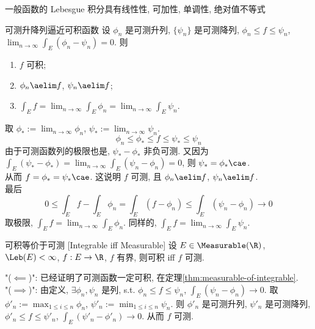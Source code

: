 \begin{ppt}
    {一般函数的 Lebesgue 积分具有线性性, 可加性, 单调性, 绝对值不等式}
\end{ppt}
\begin{thm}
    {可测升降列逼近可积函数}
    设 \({\phi_n}\) 是可测升列, \(\{\psi_n\}\) 是可测降列, \(\phi_n\leq f\leq\psi_n\), \(\lim_{n\to\infty}\int_E (\phi_n-\psi_n)=0\). 则
    \begin{enumerate}
        \item \(f\) 可积;
        \item \(\phi_n\aelim f\), \(\psi_n\aelim f\);
        \item \(\displaystyle\int_E f = \lim_{n\to\infty} \int_E \phi_n = \lim_{n\to\infty} \int_E \psi_n\).
    \end{enumerate}
\end{thm}
\begin{prf}
    取 \(\phi_*:=\lim_{n\to\infty}\phi_n\), \(\psi_*:=\lim_{n\to\infty}\psi_n\). 
    \[\phi_n\leq\phi_*\leq f\leq\psi_*\leq\psi_n\]
    由于可测函数列的极限也是\MeasurableFunc{}, \(\psi_*-\phi_*\) 非负可测. 又因为 \(\int_E (\psi_*-\phi_*)=\lim_{n\to\infty}\int_E (\psi_n-\phi_n)=0\), 则 \(\psi_*= \phi_*\cae\). \\
    从而 \(f=\phi_*=\psi_*\cae\). 这说明 \(f\) 可测, 且 \(\phi_n\aelim f\), \(\psi_n\aelim f\). \\
    最后
    \[0\leq\int_E f-\int_E \phi_n=\int_E (f-\phi_n)\leq\int_E(\psi_n-\phi_n)\to 0\]
    取极限, \(\int_E f = \lim_{n\to\infty} \int_E \phi_n\). 同样的, \(\int_E f = \lim_{n\to\infty} \int_E \psi_n\).
\end{prf}
\begin{thm}
    {可积等价于可测}
    [Integrable iff Measurable]
    设 $E\in\Measurable(\R)$, \(\Leb(E)<\infty\), \(f:E\to\R\), \(f\) 有界, 则可积 iff \(f\) 可测.
\end{thm}
\begin{prf}
    "($\impliedby$)": 已经证明了可测函数一定可积, 在定理\ref{thm:measurable-of-integrable}.\\
    "($\implies$)": 由定义, \(\exists\phi_n, \psi_n\) 是\SimpleFunc{}列, s.t. \(\phi_n\leq f\leq\psi_n\), \(\int_E (\psi_n-\phi_n)\to 0\). 取 \(\phi'_n:=\max_{1\leq i\leq n}\phi_n\), \(\psi'_n:=\min_{1\leq i\leq n}\psi_n\). 则 \(\phi'_n\) 是可测升列, \(\psi'_n\) 是可测降列, \(\phi'_n\leq f\leq\psi'_n\), \(\int_E (\psi'_n-\phi'_n)\to 0\). 从而 \(f\) 可测.
\end{prf}

